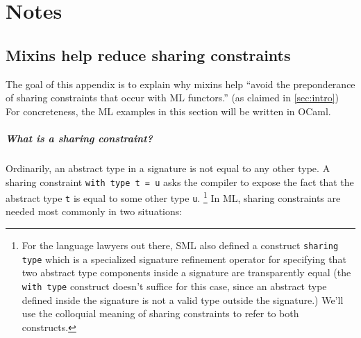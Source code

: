 \appendix

\chapter{Notes}

\section{Mixins help reduce sharing constraints}
\label{sec:mixins-reduce-sharing-constraints}

The goal of this appendix is to explain why mixins help ``avoid the
preponderance of sharing constraints that occur with ML functors.''
(as claimed in \cref{sec:intro})  For concreteness, the ML
examples in this section will be written in OCaml.

\paragraph{What is a sharing constraint?}
Ordinarily, an abstract type in a signature is not equal to any other type.  A
sharing constraint \verb|with type t = u| asks the compiler to expose
the fact that the abstract type \verb|t| is equal to some other type \verb|u|.%
\footnote{For the language lawyers out there, SML also defined a
construct \texttt{sharing type} which is a specialized signature
refinement operator for specifying that two abstract type components
inside a signature are transparently equal (the \texttt{with type} construct
doesn't suffice for this case, since an abstract type defined inside
the signature is not a valid type outside the signature.) We'll use
the colloquial meaning of sharing constraints to refer to both constructs.}
In ML, sharing constraints are needed most commonly in two situations:

